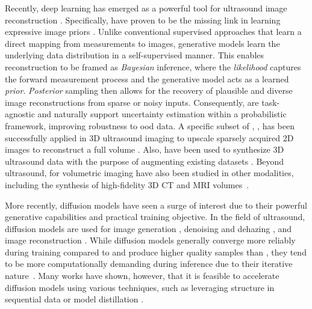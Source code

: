 \documentclass[journal,twoside,web,dvipsnames]{ieeecolor}          %
\begin{document}
Recently, deep learning has emerged as a powerful tool for ultrasound image reconstruction \cite{van2019deep}. Specifically,  have proven to be the missing link in learning expressive image priors \cite{van2024active, stevensDeepGenerative2025}.
Unlike conventional supervised approaches that learn a direct mapping from measurements to images, generative models learn the underlying data distribution in a self-supervised manner. This enables reconstruction to be framed as \emph{Bayesian} inference, where the \emph{likelihood} captures the forward measurement process and the generative model acts as a learned \emph{prior}. \emph{Posterior} sampling then allows for the recovery of plausible and diverse image reconstructions from sparse or noisy inputs. Consequently,  are task-agnostic and naturally support uncertainty estimation within a probabilistic framework, improving robustness to \acrfull{ood} data. A specific subset of , , has been successfully applied in 3D ultrasound imaging to upscale sparsely acquired 2D images to reconstruct a full volume \cite{he2020deep, dai2021self}. Also,  have been used to synthesize 3D ultrasound data with the purpose of augmenting existing datasets \cite{wulff2023towards}. Beyond ultrasound,  for volumetric imaging have also been studied in other modalities, including the synthesis of high-fidelity 3D CT and MRI volumes~\cite{Guo2025-sv,sun2022hierarchical,chen2024towards}.

More recently, diffusion models have seen a surge of interest due to their powerful generative capabilities and practical training objective. In the field of ultrasound, diffusion models are used for image generation \cite{stojanovski2023echo, dominguez2024diffusion, freiche2025ultrasound}, denoising and dehazing \cite{stevens_removing_2023, stevens2024dehazing, asgariandehkordi2024denoising}, and image reconstruction \cite{zhang2023ultrasound, durrer2024denoising, penninga2025deep}. While diffusion models generally converge more reliably during training compared to  and produce higher quality samples than , they tend to be more computationally demanding during inference due to their iterative nature~\cite{cao2024survey}. Many works have shown, however, that it is feasible to accelerate diffusion models using various techniques, such as leveraging structure in sequential data \cite{stevens2024sequential} or model distillation \cite{meng2023distillation}.
\end{document}
